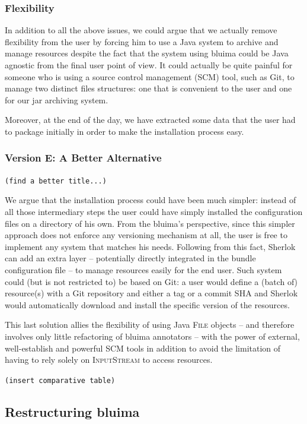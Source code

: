 \documentclass{article}
\newcommand{\ID}[1]{{\textsc{#1}}}
\newcommand{\TODO}[1]{\texttt{\textcolor{YellowOrange}{(#1)}}} %
\begin{document}
\subsubsection{Flexibility}

In addition to all the above issues, we could argue that we actually remove flexibility from the user by forcing him to use a Java system to archive and manage resources despite the fact that the system using bluima could be Java agnostic from the final user point of view. It could actually be quite painful for someone who is using a source control management (SCM) tool, such as Git, to manage two distinct files structures: one that is convenient to the user and one for our jar archiving system.

Moreover, at the end of the day, we have extracted some data that the user had to package initially in order to make the installation process easy.

\subsubsection{Version E: A Better Alternative}

\TODO{find a better title...}

We argue that the installation process could have been much simpler: instead of all those intermediary steps the user could have simply installed the configuration files on a directory of his own. From the bluima's perspective, since this simpler approach does not enforce any versioning mechanism at all, the user is free to implement any system that matches his needs. Following from this fact, Sherlok can add an extra layer -- potentially directly integrated in the bundle configuration file -- to manage resources easily for the end user. Such system could (but is not restricted to) be based on Git: a user would define a (batch of) resource(s) with a Git repository and either a tag or a commit SHA and Sherlok would automatically download and install the specific version of the resources.

This last solution allies the flexibility of using Java \ID{File} objects -- and therefore involves only little refactoring of bluima annotators -- with the power of external, well-establish and powerful SCM tools in addition to avoid the limitation of having to rely solely on \ID{InputStream} to access resources.

\TODO{insert comparative table}

\subsection{Restructuring bluima}
\end{document}
